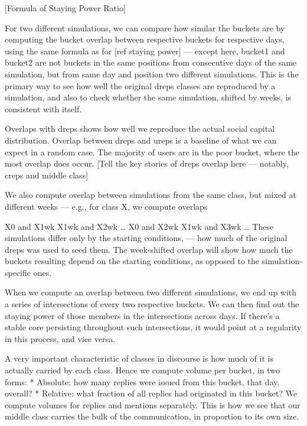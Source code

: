 \documentclass[10pt,oneside]{memoir}
\begin{document}
[Formula of Staying Power Ratio]


For two different simulations, we can compare how similar the buckets are by computing the bucket overlap between respective buckets for respective days, using the same formula as for [ref staying power] --- except here, bucket1 and bucket2 are not buckets in the same positions from consecutive days of the same simulation,  but from same day and position two different simulations.  This is the primary way to see how well the original dreps classes are reproduced by a simulation, and also to check whether the same simulation, shifted by weeks, is consistent with itself.


Overlaps with dreps shows how well we reproduce the actual social capital distribution.  Overlap between dreps and ureps is a baseline of what we can expect in a random case.  The majority of users are in the poor bucket, where the most overlap does occur.
[Tell the key stories of dreps overlap here --- notably, creps and middle class]


We also compute overlap between simulations from the same class, but mixed at different weeks --- e.g., for class X, we compute overlaps


X0 and X1wk
X1wk and X2wk
{\ldots}
X0 and X2wk
X1wk and X3wk
{\ldots}
These simulations differ only by the starting conditions, --- how much of the original dreps was used to seed them.  The week-shifted overlap will show how much the buckets resulting depend on the starting conditions, as opposed to the simulation-specific ones.


When we compute an overlap between two different simulations, we end up with a series of intersections of every two respective buckets.  We can then find out the staying power of those members in the intersections across days.  If there's a stable core persisting throughout such intersections, it would point at a regularity in this process, and vice versa.


A very important characteristic of classes in discourse is how much of it is actually carried by each class.  Hence we compute volume per bucket, in two forms:
* Absolute: how many replies were issued from this bucket, that day, overall?
* Relative: what fraction of all replies had originated in this bucket?
We compute volumes for replies and mentions separately.  This is how we see that our middle class carries the bulk of the communication, in proportion to its own size.  
\end{document}
